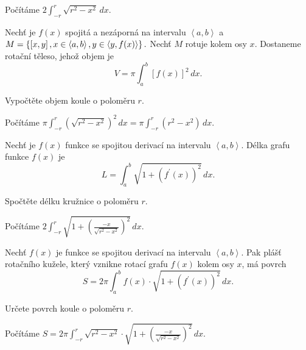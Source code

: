 \begin{reseni}
Počítáme $2\int_{-r}^r \sqrt{r^2-x^2}\, dx  $.
\end{reseni}

\begin{pozn}
    Nechť je $f(x)$ spojitá a nezáporná na intervalu $\left < a,b \right > $ a
    $M=\left \{ \left [ x,y \right ], x \in \left < a,b \right >,\linebreak y \in \left < y, f(x) \right >    \right \} .$
    Nechť $M$ rotuje kolem osy $x$. Dostaneme rotační těleso, jehož objem je
    $$V=\pi \int _a^b \left [ f(x) \right ]^2 \, dx. $$
\end{pozn}

\begin{priklad}
Vypočtěte objem koule o poloměru $r$.
\end{priklad}

\begin{reseni}
Počítáme $\pi\int _{-r}^r(\sqrt{r^2-x^2} )^2 \, dx=\pi\int_{-r}^r(r^2-x^2)\, dx$.
\end{reseni}

\begin{pozn}
Nechť je $f(x)$ funkce se spojitou derivací na intervalu $\left < a,b \right > $. Délka
grafu funkce $f(x)$ je
$$L=\int_a^b \sqrt{1+(f^\prime(x))^2}\, dx. $$
\end{pozn}

\begin{priklad}
Spočtěte délku kružnice o poloměru $r$.
\end{priklad}

\begin{reseni}
Počítáme $2\int _{-r}^r \sqrt{1+\left ( \frac{-x}{\sqrt{r^2-x^2}} \right )^2 }\, dx.  $
\end{reseni}

\begin{pozn}
    Nechť $f(x)$ je funkce se spojitou derivací na intervalu $\left < a,b \right > .$
    Pak plášť rotačního kužele, který vznikne rotací grafu $f(x)$ kolem osy $x$, má
   povrch
  $$S=2\pi\int_a^b f(x)\cdot \sqrt{1+(f^\prime(x))^2}\, dx. $$
\end{pozn}

\begin{priklad}
Určete povrch koule o poloměru $r$.
\end{priklad}

\begin{reseni}
Počítáme $S=2\pi\int_{-r}^r \sqrt{r^2-x^2}\cdot \sqrt{1+\left ( \frac{-x}{\sqrt{r^2-x^2} } \right )^2 } \, dx. $
\end{reseni}
